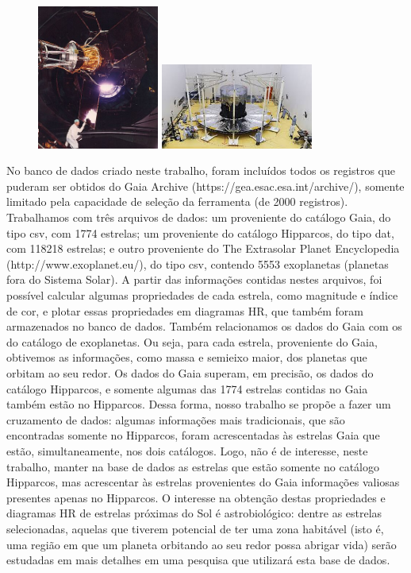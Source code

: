 \documentclass[12pt, a4paper]{article}
\begin{document}
	\begin{figure}[H]
		\hfill%
		\includegraphics[width=4cm]{Hipparcos.png}%
		\hfill%
		\includegraphics[width=5cm]{Gaia.png}%
		\hfill%
		\hfill%
	\end{figure}

	No banco de dados criado neste trabalho, foram incluídos todos os registros que puderam ser obtidos do Gaia Archive (https://gea.esac.esa.int/archive/), somente limitado pela capacidade de seleção da ferramenta (de 2000 registros). Trabalhamos com três arquivos de dados: um proveniente do catálogo Gaia, do tipo csv, com 1774 estrelas; um proveniente do catálogo Hipparcos, do tipo dat, com 118218 estrelas; e outro proveniente do The Extrasolar Planet Encyclopedia (http://www.exoplanet.eu/), do tipo csv, contendo 5553 exoplanetas (planetas fora do Sistema Solar).
	A partir das informações contidas nestes arquivos, foi possível calcular algumas propriedades de cada estrela, como magnitude e índice de cor, e plotar essas propriedades em diagramas HR, que também foram armazenados no banco de dados.
	Também relacionamos os dados do Gaia com os do catálogo de exoplanetas. Ou seja, para cada estrela, proveniente do Gaia, obtivemos as informações, como massa e semieixo maior, dos planetas que orbitam ao seu redor. 
	Os dados do Gaia superam, em precisão, os dados do catálogo Hipparcos, e somente algumas das 1774 estrelas contidas no Gaia também estão no Hipparcos. Dessa forma, nosso trabalho se propõe a fazer um cruzamento de dados: algumas informações mais tradicionais, que são encontradas somente no Hipparcos, foram acrescentadas às estrelas Gaia que estão, simultaneamente, nos dois catálogos. Logo, não é de interesse, neste trabalho, manter na base de dados as estrelas que estão somente no catálogo Hipparcos, mas acrescentar às estrelas provenientes do Gaia informações valiosas presentes apenas no Hipparcos.
	O interesse na obtenção destas propriedades e diagramas HR de estrelas próximas do Sol é astrobiológico: dentre as estrelas selecionadas, aquelas que tiverem potencial de ter uma zona habitável (isto é, uma região em que um planeta orbitando ao seu redor possa abrigar vida) serão estudadas em mais detalhes em uma pesquisa que utilizará esta base de dados. 
	
\end{document}
